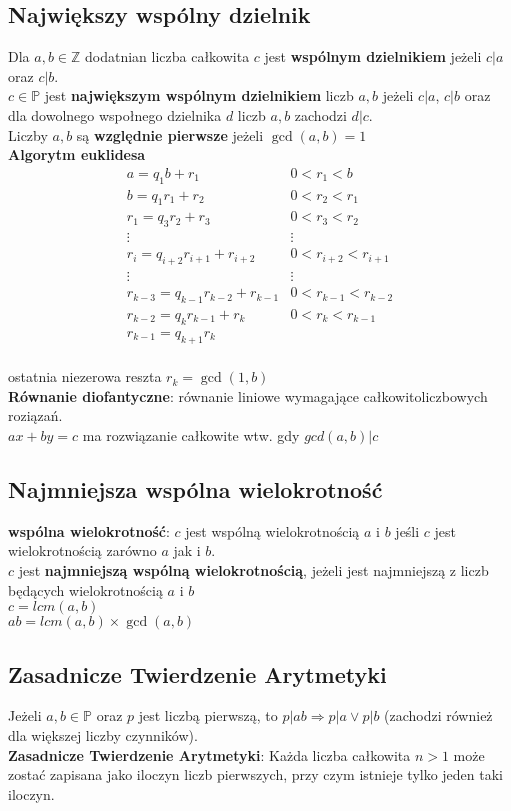 \documentclass[a4paper,12pt]{article}
\begin{document}
\subsection{Największy wspólny dzielnik}
	Dla $a, b\in \mathbb{Z}$ dodatnian liczba całkowita $c$ jest \textbf{wspólnym dzielnikiem} jeżeli $c|a$ oraz $c|b$.\\
	$c\in\mathbb{P}$ jest \textbf{największym wspólnym dzielnikiem} liczb $a, b$ jeżeli $c|a$, $c|b$ oraz dla dowolnego wspołnego dzielnika $d$ liczb $a, b$ zachodzi $d|c$.\\
	Liczby $a,b$ są \textbf{względnie pierwsze} jeżeli $\gcd(a,b)=1$\\
	\textbf{Algorytm euklidesa}$$
	\begin{matrix}
		a=q_1b+r_1 &0<r_1<b\\
		b=q_1r_1+r_2 & 0<r_2<r_1\\
		r_1=q_3r_2+r_3 & 0<r_3<r_2\\
		\vdots & \vdots \\
		r_i=q_{i+2}r_{i+1}+r_{i+2} & 0<r_{i+2}<r_{i+1}\\
		\vdots & \vdots \\
		r_{k-3}=q_{k-1}r_{k-2}+r_{k-1} & 0<r_{k-1}<r_{k-2}\\
		r_{k-2}=q_{k}r_{k-1}+r_{k} & 0<r_{k}<r_{k-1}\\
		r_{k-1}=q_{k+1}r_k
	\end{matrix}$$\\
	ostatnia niezerowa reszta $r_k=\gcd(1,b)$\\
\textbf{Równanie diofantyczne}: równanie liniowe wymagające całkowitoliczbowych roziązań.\\
$ax+by=c$ ma rozwiązanie całkowite wtw. gdy $gcd(a,b)|c$
\subsection{Najmniejsza wspólna wielokrotność}
\textbf{wspólna wielokrotność}: $c$ jest wspólną wielokrotnością $a$ i $b$ jeśli $c$ jest wielokrotnością zarówno $a$ jak i $b$.\\
$c$ jest \textbf{najmniejszą wspólną wielokrotnością}, jeżeli jest najmniejszą z liczb będących wielokrotnością $a$ i $b$\\
$c=lcm(a,b)$ \\
$ab=lcm(a,b)\times\gcd(a,b)$
\subsection{Zasadnicze Twierdzenie Arytmetyki}
Jeżeli $a,b\in\mathbb{P}$ oraz $p$ jest liczbą pierwszą, to $p|ab\Rightarrow p|a \vee p|b$ (zachodzi również dla większej liczby czynników).\\
\textbf{Zasadnicze Twierdzenie Arytmetyki}: Każda liczba całkowita $n>1$ może zostać zapisana jako iloczyn liczb pierwszych, przy czym istnieje tylko jeden taki iloczyn.
\end{document}
